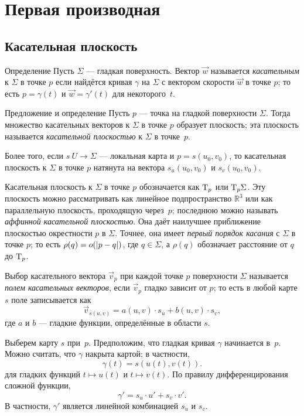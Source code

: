 \chapter{Первая производная}
\label{chap:first-order}
\section{Касательная плоскость}

\begin{thm}{Определение}\label{def:tangent-vector}
Пусть $\Sigma$ --- гладкая поверхность.
Вектор $\vec w$ называется \emph{касательным} к $\Sigma$ в точке $p$ если найдётся кривая $\gamma$ на $\Sigma$ с вектором скорости $\vec w$ в точке $p$;
то есть $p=\gamma(t)$ и $\vec w=\gamma'(t)$ для некоторого~$t$.
\end{thm}

\begin{thm}{Предложение и определение}\label{def:tangent-plane}
Пусть $p$ --- точка на гладкой поверхности $\Sigma$.
Тогда множество касательных векторов к $\Sigma$ в точке $p$ образует плоскость;
эта плоскость называется \emph{касательной плоскостью} к $\Sigma$ в точке~$p$.

Более того, если $s\:U\to \Sigma$ --- локальная карта и $p=s(u_0,v_0)$, то 
касательная плоскость к $\Sigma$ в точке $p$ натянута на вектора $s_u(u_0,v_0)$ и $s_v(u_0,v_0)$.
\end{thm}

Касательная плоскость к $\Sigma$ в точке $p$ обозначается как $\mathrm{T}_p$ или $\mathrm{T}_p\Sigma$.
Эту плоскость можно рассматривать как линейное подпространство $\mathbb{R}^3$ или как параллельную плоскость, проходящую через~$p$;
последнюю можно называть \emph{аффинной касательной плоскостью}.
Она даёт наилучшее приближение плоскостью окрестности $p$ в $\Sigma$.
Точнее, 
она имеет \emph{первый порядок касания} с $\Sigma$ в точке $p$;
то есть $\rho(q)\z=o(|p\z-q|)$, где $q\in \Sigma$, а $\rho(q)$ обозначает расстояние от $q$ до $\mathrm{T}_p$.

Выбор касательного вектора $\vec v_p$ при каждой точке $p$ поверхности $\Sigma$ называется \emph{полем касательных векторов}, если $\vec v_p$ гладко зависит от $p$;
то есть в любой карте $s$ поле записывается как
\[\vec v_{s(u,v)}=a(u,v)\cdot s_u+b(u,v)\cdot s_v,\]
где $a$ и $b$ --- гладкие функции, определённые в области $s$.

Выберем карту $s$ при~$p$.
Предположим, что гладкая кривая $\gamma$ начинается в~$p$.
Можно считать, что $\gamma$ накрыта картой;
в частности, 
\[\gamma(t)=s(u(t),v(t)).\]
для гладких функций $t\mapsto u(t)$ и $t\mapsto v(t)$.
По правилу дифференцирования сложной функции, 
\[\gamma'=s_u\cdot u'+ s_v\cdot v'.\]
В частности, $\gamma'$ является линейной комбинацией $s_u$ и $s_v$.

